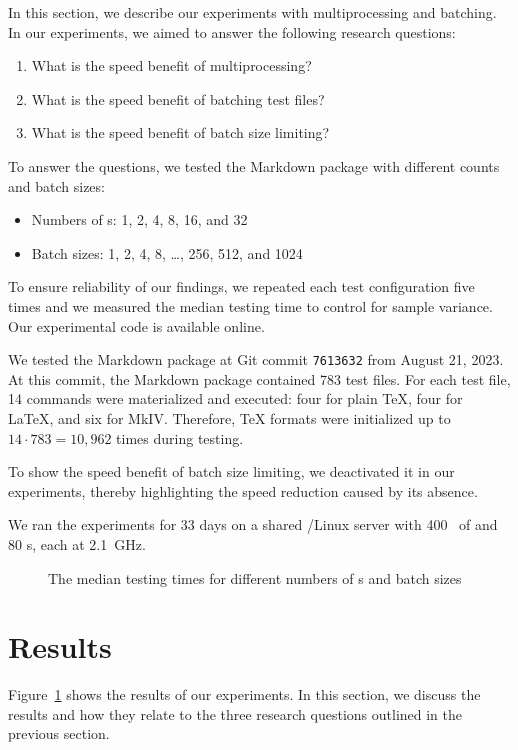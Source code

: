 \documentclass[final]{ltugboat}
\begin{document}
In this section, we describe our experiments with multiprocessing and batching. In our experiments, we aimed to answer the following research questions:
\begin{enumerate}
\item What is the speed benefit of multiprocessing?
\item What is the speed benefit of batching test files?
\item What is the speed benefit of batch size limiting?
\end{enumerate}
To answer the questions, we tested the Markdown package with different  counts and batch sizes:
\begin{itemize}
\item Numbers of s: 1, 2, 4, 8, 16, and 32
\item Batch sizes: 1, 2, 4, 8, \ldots, 256, 512, and 1024
\end{itemize}
To ensure reliability of our findings, we repeated each test configuration five times and we measured the median testing time to control for sample variance. Our experimental code is available online.~\cite{starynovotny2023measure}

We tested the Markdown package at Git commit \texttt{7613632} from August 21, 2023. At this commit, the Markdown package contained 783 test files. For each test file, 14 commands were materialized and executed: four for plain \TeX, four for \LaTeX, and six for  MkIV. Therefore, \TeX{} formats were initialized up to $14\cdot 783 = 10{,}962$ times during testing.

To show the speed benefit of batch size limiting, we deactivated it in our experiments, thereby highlighting the speed reduction caused by its absence.

We ran the experiments for 33 days on a shared \GNU/Linux server with 400~ of  and 80 s, each at 2.1~GHz.

\begin{figure}[b!]

\caption{The median testing times for different numbers of s and batch sizes}
\label{fig:results}
\end{figure}

\section{Results}
\label{sec:results}

Figure~\ref{fig:results} shows the results of our experiments. In this section, we discuss the results and how they relate to the three research questions outlined in the previous section.
\end{document}
